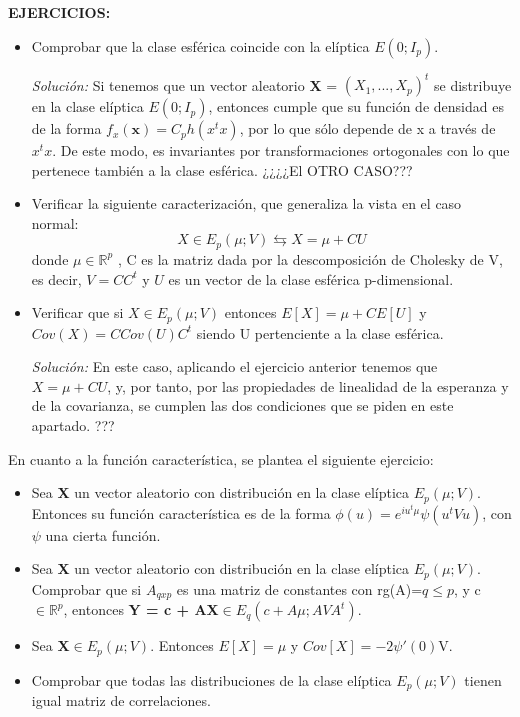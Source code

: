 \documentclass{article}
\theoremstyle{theorem-style}  %
\theoremstyle{definition}
\theoremstyle{example-style}
\begin{document}
	\textbf{EJERCICIOS:}
		\begin{itemize}
			\item Comprobar que la clase esférica coincide con la elíptica $E(0; I_p )$.
			
			\textit{Solución:} Si tenemos que un vector aleatorio \textbf{X} = $(X_1, ..., X_p)^t$ se distribuye en la clase elíptica $E(0; I_p )$, entonces cumple que su función de densidad es de la forma $f_x(\textbf{x}) = C_p h (x^tx)$, por lo que sólo depende de x a través de $x^tx$. De este modo, es invariantes por transformaciones ortogonales con lo que pertenece también a la clase esférica. ¿¿¿¿El OTRO CASO???
			
			\item Verificar la siguiente caracterización, que generaliza la vista en el caso normal: $$ X \in E_p(\mu; V) \leftrightarrows X = \mu + CU $$ donde $\mu \in \mathbb{R}^p$ , C es la matriz dada por la descomposición de Cholesky de V, es decir, $V=CC^t$ y $U$ es un vector de la clase esférica p-dimensional.
			
			\item Verificar que si $X \in E_p(\mu; V)$  entonces $E[X] = \mu + CE[U]$ y $Cov(X)= C Cov(U)C^t$ siendo U pertenciente a la clase esférica.
			
			\textit{Solución:} En este caso, aplicando el ejercicio anterior tenemos que  $X=\mu + CU$, y, por tanto, por las propiedades de linealidad de la esperanza y de la covarianza, se cumplen las dos condiciones que se piden en este apartado. ???
		\end{itemize}
		
		En cuanto a la función característica, se plantea el siguiente ejercicio:
		
		\begin{itemize}
			\item Sea \textbf{X} un vector aleatorio con distribución en la clase elíptica $E_p(\mu; V)$. Entonces su función característica es de la forma $\phi(u)=e^{iu^t\mu}\psi(u^tVu)$, con $\psi$ una cierta función.
			
			\item Sea \textbf{X} un vector aleatorio con distribución en la clase elíptica $E_p(\mu; V)$. Comprobar que si $A_{qxp}$ es una matriz de constantes con rg(A)=$q\leq p$, y c$\in\mathbb{R}^p$, entonces \textbf{Y = c + AX}$\in E_q(c+A\mu; AVA^t)$.
			
			\item Sea \textbf{X}$\in E_p(\mu; V)$. Entonces $E[X]=\mu$ y $Cov[X]=-2\psi'(0)$V.
			
			\item Comprobar que todas las distribuciones de la clase elíptica $E_p(\mu; V)$ tienen igual matriz de correlaciones.
		\end{itemize}
		
\end{document}
